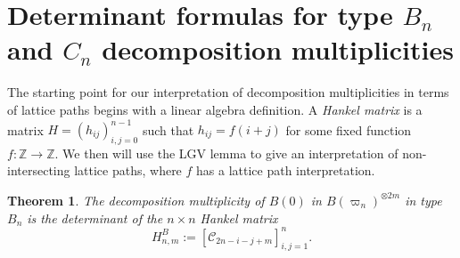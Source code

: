\documentclass[11pt, leqno]{amsart}
\theoremstyle{plain}
\newtheorem{theorem}{Theorem}[section]
\theoremstyle{definition}
\numberwithin{equation}{section}
\newcommand{\fw}{\varpi} %
\newcommand{\seteq}{\mathbin{:=}}
\newcommand{\Cat}{\mathcal{C}} %
\newcommand{\Z}{\mathbb{Z}}
\newcommand{\defn}[1]{{\color{darkred}\emph{#1}}} %
\begin{document}
\section{Determinant formulas for type $B_n$ and $C_n$ decomposition multiplicities}
\label{sec:decomposition_multiplicities}


The starting point for our interpretation of decomposition multiplicities in terms of lattice paths begins with a linear algebra definition. A \defn{Hankel matrix} is a matrix $H = (h_{ij})_{i,j=0}^{n-1}$ such that $h_{ij} = f(i+j)$ for some fixed function $f \colon \Z \to \Z$. We then will use the LGV lemma to give an interpretation of non-intersecting lattice paths, where $f$ has a lattice path interpretation.

\begin{theorem}
\label{thm:Hankel_Catalan_det}
The decomposition multiplicity of $B(0)$ in $B(\fw_n)^{\otimes 2m}$ in type $B_n$ is the determinant of the $n \times n$ Hankel matrix
\[
H^B_{n,m} \seteq \left[ \Cat_{2n-i-j+m} \right]_{i,j=1}^n.
\]
\end{theorem}
\end{document}
